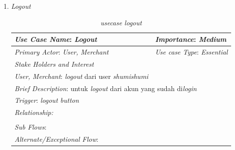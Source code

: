 \documentclass[a4paper]{article}
\begin{document}
\begin{enumerate}
\begin{enumerate}
        \newpage
        \item \textit{Logout}
\begin{table}[h]
    \centering
    \begin{tabular}{|lll}
    \hline
    \multicolumn{1}{|l|}{\textit{Use Case Name}: \textit{Logout}}             & \multicolumn{2}{l|}{\textit{Importance}: \textit{Medium}}   \\ \hline
    \multicolumn{1}{|l|}{\textit{Primary Actor}: \textit{User, Merchant}}             & \multicolumn{2}{l|}{\textit{Use case Type}: \textit{Essential}} \\ \hline
    \multicolumn{1}{|l|}{\textit{Stake Holders and Interest}} &                               &                               \\ \cline{1-1}
    \multicolumn{1}{|l|}{\textit{User, Merchant}: \textit{logout} dari user \textit{shumishumi}}                                                     &                               &                               \\ \hline
    \multicolumn{3}{|l|}{\textit{Brief Description}: untuk \textit{logout} dari akun yang sudah di\textit{login}}                                                                         \\ \hline
    \multicolumn{3}{|l|}{\textit{Trigger}: \textit{logout button}}                                                                                   \\ \hline
    \multicolumn{3}{|l|}{\textit{Relationship:}}                                                                              \\ \hline
    \multicolumn{3}{|l|}{}                                                                                                                     \\ \hline
    \multicolumn{3}{|l|}{\textit{Sub Flows}:}                                                                                 \\ \hline
    \multicolumn{3}{|l|}{\textit{Alternate/Exceptional Flow}:}                                                                \\ \hline
    \end{tabular}
    \caption{\textit{usecase logout} }
\end{table}


\end{enumerate}
\end{enumerate}
\end{document}
